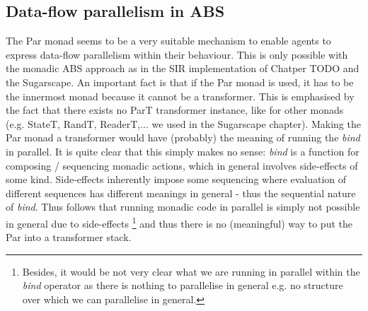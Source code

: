 \subsection{Data-flow parallelism in ABS}
The Par monad seems to be a very suitable mechanism to enable agents to express data-flow parallelism within their behaviour. This is only possible with the monadic ABS approach as in the SIR implementation of Chatper TODO and the Sugarscape. An important fact is that if the Par monad is used, it has to be the innermost monad because it cannot be a transformer. This is emphasised by the fact that there exists no ParT transformer instance, like for other monads (e.g. StateT, RandT, ReaderT,... we used in the Sugarscape chapter). Making the Par monad a transformer would have (probably) the meaning of running the \textit{bind} in parallel. It is quite clear that this simply makes no sense: \textit{bind} is a function for composing / sequencing monadic actions, which in general involves side-effects of some kind. Side-effects inherently impose some sequencing where evaluation of different sequences has different meanings in general - thus the sequential nature of \textit{bind}. Thus follows that running monadic code in parallel is simply not possible in general due to side-effects \footnote{Besides, it would be not very clear what we are running in parallel within the \textit{bind} operator as there is nothing to parallelise in general e.g. no structure over which we can parallelise in general.} and thus there is no (meaningful) way to put the Par into a transformer stack.